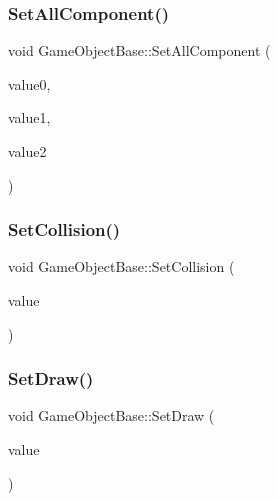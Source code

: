 \subsubsection{\texorpdfstring{Set\+All\+Component()}{SetAllComponent()}}
{\footnotesize\ttfamily void Game\+Object\+Base\+::\+Set\+All\+Component (\begin{DoxyParamCaption}\item[{\mbox{\hyperlink{class_update_base}{Update\+Base}} $\ast$}]{value0,  }\item[{\mbox{\hyperlink{class_draw_base}{Draw\+Base}} $\ast$}]{value1,  }\item[{\mbox{\hyperlink{class_collision_base}{Collision\+Base}} $\ast$}]{value2 }\end{DoxyParamCaption})\hspace{0.3cm}{\ttfamily [inline]}}

\mbox{\label{class_game_object_base_a4aeb0212f5a390570d050bfef51b7818}} 
\subsubsection{\texorpdfstring{Set\+Collision()}{SetCollision()}}
{\footnotesize\ttfamily void Game\+Object\+Base\+::\+Set\+Collision (\begin{DoxyParamCaption}\item[{\mbox{\hyperlink{class_collision_base}{Collision\+Base}} $\ast$}]{value }\end{DoxyParamCaption})\hspace{0.3cm}{\ttfamily [inline]}}

\mbox{\label{class_game_object_base_ab548b4208b8da2af6e3abb533ea53da9}} 
\subsubsection{\texorpdfstring{Set\+Draw()}{SetDraw()}}
{\footnotesize\ttfamily void Game\+Object\+Base\+::\+Set\+Draw (\begin{DoxyParamCaption}\item[{\mbox{\hyperlink{class_draw_base}{Draw\+Base}} $\ast$}]{value }\end{DoxyParamCaption})\hspace{0.3cm}{\ttfamily [inline]}}

